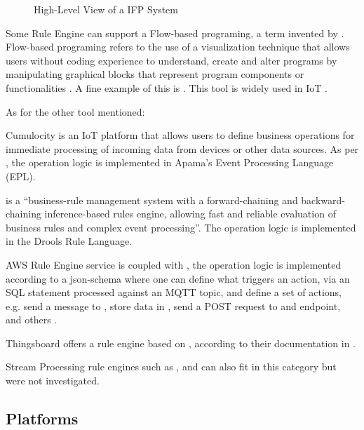 \begin{figure}[H]
   \centering
  \resizebox{\columnwidth}{!}
  {
     
  }
  \caption[High-Level View of a \gls{IFP} System]{High-Level View of a \gls{IFP} System}
  \label{fig:stateofart:arch:infra:rule:ifp}
\end{figure}

Some Rule Engine can support a Flow-based programing, a term invented by \cite{morrison1994flow}. Flow-based programing refers to the use of a visualization technique that allows users without coding experience to understand, create and alter programs by manipulating graphical blocks that represent program
components or functionalities \parencite{morrison2010flow}. A fine example of this is . This tool is widely used in \gls{IoT} \parencite{10.1145/3448891.3448938}.

As for the other tool mentioned:

Cumulocity is an \gls{IoT} platform that allows users to define business operations for immediate processing of incoming data from devices or other data sources. As per \cite{cumulocity}, the operation logic is implemented in Apama's Event Processing Language (EPL).

 is a ``business-rule management system with a forward-chaining and backward-chaining inference-based rules engine, allowing fast and reliable evaluation of business rules and complex event processing''. The operation logic is implemented in the Drools Rule Language.

AWS Rule Engine service is coupled with , the operation logic is implemented according to a json-schema where one can define what triggers an action, via an \gls{SQL} statement processed against an \gls{MQTT} topic, and define a set of actions, e.g. send a message to , store data in , send a POST request to and endpoint, and others \parencite{aws-rules}.

Thingsboard offers a rule engine based on , according to their documentation in .

Stream Processing rule engines such as ,  and  can also fit in this category but were not investigated.

\subsection{Platforms}
\label{subsec:stateofart:arch:platforms}

